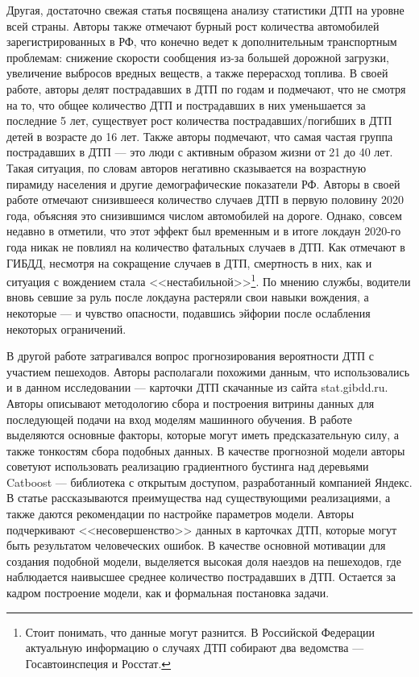 \documentclass[a4paper, 14pt]{article}
\begin{document}
Другая, достаточно свежая статья \cite{klachkiva2020analiz} посвящена анализу статистики ДТП на уровне всей страны. Авторы также отмечают бурный рост количества автомобилей зарегистрированных в РФ, что конечно ведет к дополнительным транспортным проблемам: снижение скорости сообщения из-за большей дорожной загрузки, увеличение выбросов вредных веществ, а также перерасход топлива. В своей работе, авторы делят пострадавших в ДТП по годам и подмечают, что не смотря на то, что общее количество ДТП и пострадавших в них уменьшается за последние 5 лет, существует рост количества пострадавших/погибших в ДТП детей в возрасте до 16 лет. Также авторы подмечают, что самая частая группа пострадавших в ДТП --- это люди с активным образом жизни от 21 до 40 лет. Такая ситуация, по словам авторов негативно сказывается на возрастную пирамиду населения и другие демографические показатели РФ. Авторы в своей работе отмечают снизившееся количество случаев ДТП в первую половину 2020 года, объясняя это снизившимся числом автомобилей на дороге. Однако, совсем недавно в \cite{rbkNews} отметили, что этот эффект был временным и в итоге локдаун 2020-го года никак не повлиял на количество фатальных случаев в ДТП. Как отмечают в ГИБДД, несмотря на сокращение случаев в ДТП, смертность в них, как и ситуация с вождением стала <<нестабильной>>\footnote{Стоит понимать, что данные могут разнится. В Российской Федерации актуальную информацию о случаях ДТП собирают два ведомства --- Госавтоинспеция и Росстат.}. По мнению службы, водители вновь севшие за руль после локдауна растеряли свои навыки вождения, а некоторые --- и чувство опасности, подавшись эйфории после ослабления некоторых ограничений.

В другой работе \cite{kuzmenko2020analysis} затрагивался вопрос прогнозирования вероятности ДТП с участием пешеходов. Авторы располагали похожими данным, что использовались и в данном исследовании --- карточки ДТП скачанные из сайта stat.gibdd.ru. Авторы описывают методологию сбора и построения витрины данных для последующей подачи на вход моделям машинного обучения. В работе выделяются основные факторы, которые могут иметь предсказательную силу, а также тонкостям сбора подобных данных. В качестве прогнозной модели авторы советуют использовать реализацию градиентного бустинга над деревьями Catboost --- библиотека с открытым доступом, разработанный компанией Яндекс. В статье рассказываются преимущества над существующими реализациями, а также даются рекомендации по настройке параметров модели. Авторы подчеркивают <<несовершенство>> данных в карточках ДТП, которые могут быть результатом человеческих ошибок. В качестве основной мотивации для создания подобной модели, выделяется высокая доля наездов на пешеходов, где наблюдается наивысшее среднее количество пострадавших в ДТП. Остается за кадром построение модели, как и формальная постановка задачи.
\end{document}
